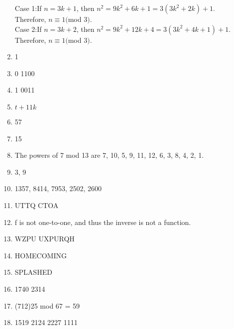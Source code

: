 \documentclass[11pt]{article}
\begin{document}
\begin{enumerate}
Case 1:If $n = 3k + 1$, then $n^2 = 9k^2 + 6k + 1 = 3(3k^2 + 2k) + 1$. \\Therefore, $n \equiv 1($mod $ 3) $.\\
Case 2:If $n = 3k + 2$, then $n^2 = 9k^2 + 12k + 4 = 3(3k^2 + 4k + 1) + 1$. \\Therefore, $n \equiv 1($mod $ 3) $.
\item 1
\item 0 1100
\item 1 0011
\item $t + 11k$
\item 57
\item 15
\item The powers of 7 mod 13 are 7, 10, 5, 9, 11, 12, 6, 3, 8, 4, 2, 1.
\item 3, 9
\item 1357, 8414, 7953, 2502, 2600
\item UTTQ CTOA
\item f is not one-to-one, and thus the inverse is not a function.
\item WZPU UXPURQH
\item HOMECOMING
\item SPLASHED
\item 1740 2314
\item (712)25 mod 67 = 59
\item 1519 2124 2227 1111

\end{enumerate}
\end{document}
